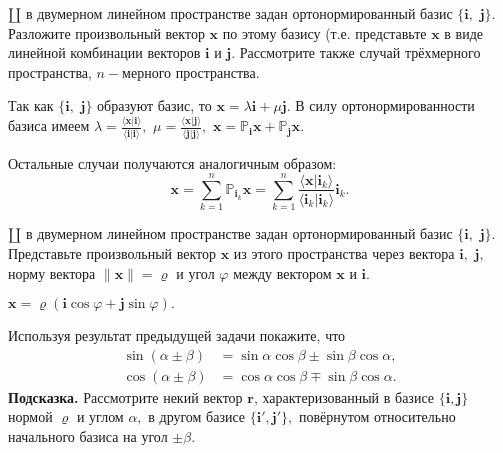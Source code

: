 \begin{task}
$\amalg$ в двумерном линейном пространстве задан ортонормированный базис
$\{\mathbf{i},$ $\mathbf{j}\}.$ Разложите произвольный вектор $\mathbf{x}$
по этому базису (т.е. представьте $\mathbf{x}$ в виде линейной комбинации
векторов $\mathbf{i}$ и $\mathbf{j}.$ Рассмотрите также случай трёхмерного пространства,
$n-$мерного пространства.
\end{task}
\begin{solution}
Так как $\{\mathbf{i},$ $\mathbf{j}\}$ образуют базис, то
$\mathbf{x} = \lambda \mathbf{i} + \mu \mathbf{j}.$ В силу ортонормированности
базиса имеем
$\lambda = \frac{\langle\mathbf{x}\vert\mathbf{i}\rangle}
		{\langle\mathbf{i}\vert\mathbf{i}\rangle},$
$\mu = \frac{\langle\mathbf{x}\vert\mathbf{j}\rangle}
		{\langle\mathbf{j}\vert\mathbf{j}\rangle},$
$\mathbf{x} = \mathbb{P}_\mathbf{i}\mathbf{x}+
\mathbb{P}_\mathbf{j}\mathbf{x}.$

Остальные случаи получаются аналогичным образом:
$$\mathbf{x} = \sum\limits_{k=1}^{n}\mathbb{P}_{\mathbf{i}_k}\mathbf{x}
 = \sum\limits_{k=1}^{n}\frac{\langle\mathbf{x}\vert\mathbf{i}_k\rangle}
 		{\langle\mathbf{i}_k\vert\mathbf{i}_k\rangle}\mathbf{i}_k.$$
\end{solution}
\begin{task}
$\amalg$ в двумерном линейном пространстве задан ортонормированный базис
$\{\mathbf{i},$ $\mathbf{j}\}.$ Представьте произвольный вектор $\mathbf{x}$
из этого пространства через вектора $\mathbf{i},$ $\mathbf{j},$ норму
вектора $\lVert \mathbf{x}\rVert = \varrho$ и угол $\varphi$ между вектором $\mathbf{x}$ и
$\mathbf{i}.$
\end{task}
\begin{solution}
$\mathbf{x} = \varrho (\mathbf{i}\cos \varphi + \mathbf{j}\sin \varphi).$
\end{solution}
\begin{task}
Используя результат предыдущей задачи покажите, что
\begin{align*}
\sin(\alpha \pm \beta)& = \sin\alpha\cos\beta\pm\sin\beta\cos\alpha,\\
\cos(\alpha \pm \beta)& = \cos\alpha\cos\beta\mp\sin\beta\cos\alpha.
\end{align*}
\textbf{Подсказка.} Рассмотрите некий вектор $\mathbf{r}$, характеризованный
в базисе $\{\mathbf{i}, \mathbf{j}\}$ нормой $\varrho$ и углом $\alpha,$
в другом базисе $\{\mathbf{i}',\mathbf{j}'\},$ повёрнутом относительно начального
базиса на угол $\pm \beta.$
\end{task}
